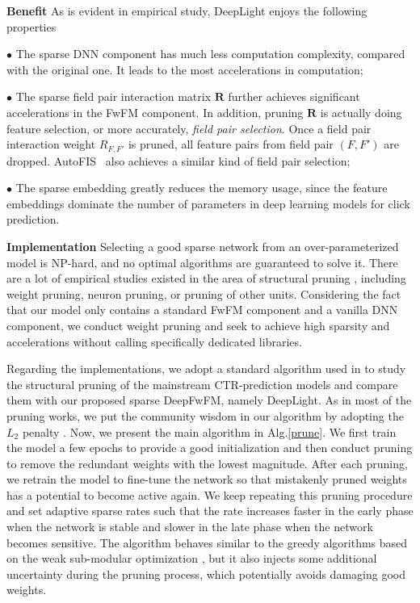 \documentclass[sigconf]{acmart}
\begin{document}
{\bf Benefit} As is evident in empirical study, DeepLight enjoys the following properties 





$\bullet$ The sparse DNN component has much less computation complexity, compared with the original one. It leads to the most accelerations in computation;

$\bullet$ The sparse field pair interaction matrix $\bm{R}$ further achieves significant accelerations in the FwFM component. In addition, pruning $\bm{R}$ is actually doing feature selection, or more accurately, \emph{field pair selection}. Once a field pair interaction weight $R_{F, F'}$ is pruned, all feature pairs from field pair $(F, F')$ are dropped. AutoFIS~\cite{autofis} also achieves a similar kind of field pair selection;

$\bullet$ The sparse embedding greatly reduces the memory usage, since the feature embeddings dominate the number of parameters in deep learning models for click prediction.



{\bf Implementation} Selecting a good sparse network from an over-parameterized model is NP-hard, and no optimal algorithms are guaranteed to solve it. There are a lot of empirical studies existed in the area of structural pruning \cite{han2015learning, hansong16, frankle2018lottery, deng2019}, including weight pruning, neuron pruning, or pruning of other units. Considering the fact that our model only contains a standard FwFM component and a vanilla DNN component, we conduct weight pruning and seek to achieve high sparsity and accelerations without calling specifically dedicated libraries. 



Regarding the implementations, we adopt a standard algorithm used in \citep{deng2019, frankle2018lottery} to study the structural pruning of the mainstream CTR-prediction models and compare them with our proposed sparse DeepFwFM, namely DeepLight. As in most of the pruning works, we put the community wisdom in our algorithm by adopting the $L_2$ penalty \citep{han2015learning, hansong16}. Now, we present the main algorithm in Alg.\ref{prune}. We first train the model a few epochs to provide a good initialization and then conduct pruning to remove the redundant weights with the lowest magnitude. After each pruning, we retrain the model to fine-tune the network so that mistakenly pruned weights has a potential to become active again. We keep repeating this pruning procedure and set adaptive sparse rates such that the rate increases faster in the early phase when the network is stable and slower in the late phase when the network becomes sensitive. The algorithm behaves similar to the greedy algorithms based on the weak sub-modular optimization \cite{Abhimanyu11}, but it also injects some additional uncertainty during the pruning process, which potentially avoids damaging good weights. 
\end{document}
